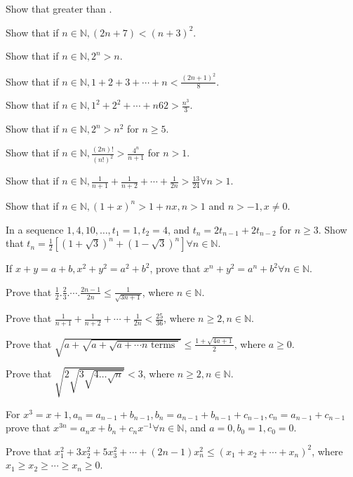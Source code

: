 \item Show that  greater
  than .
\item Show that if $n\in\mathbb{N}, (2n + 7) < (n + 3)^2$.
\item Show that if $n\in\mathbb{N}, 2^n > n$.
\item Show that if $n\in\mathbb{N}, 1 + 2 + 3 + \cdots + n < \frac{(2n + 1)^2}{8}$.
\item Show that if $n\in\mathbb{N}, 1^2 + 2^2 + \cdots + n62 > \frac{n^3}{3}$.
\item Show that if $n\in\mathbb{N}, 2^n > n^2$ for $n\geq 5$.
\item Show that if $n\in\mathbb{N}, \frac{(2n)!}{(n!)^2} > \frac{4^n}{n + 1}$ for $n > 1$.
\item Show that if $n\in\mathbb{N}, \frac{1}{n + 1} + \frac{1}{n + 2} + \cdots + \frac{1}{2n} >
  \frac{13}{24}\forall n > 1$.
\item Show that if $n\in\mathbb{N}, (1 + x)^n > 1 + nx, n > 1$ and $n > -1, x\neq 0$.
\item In a sequence $1, 4, 10, \ldots, t_1 = 1, t_2 = 4$, and $t_n = 2t_{n - 1 } + 2t_{n - 2}$ for $n\geq
  3$. Show that $t_n = \frac{1}{2}\left[(1 + \sqrt{3})^n + (1 - \sqrt{3})^n\right]\forall n\in\mathbb{N}$.
\item If $x + y = a + b, x^2 + y^2 = a^2 + b^2$, prove that $x^n + y^2 = a^n + b^2\forall n\in\mathbb{N}$.
\item Prove that $\frac{1}{2}.\frac{2}{3}.\cdots.\frac{2n - 1}{2n}\leq \frac{1}{\sqrt{3n + 1}}$, where $n\in\mathbb{N}$.
\item Prove that $\frac{1}{n + 1} + \frac{1}{n + 2} + \cdots + \frac{1}{2n} < \frac{25}{36}$, where $n\geq 2, n\in\mathbb{N}$.
\item Prove that $\sqrt{a + \sqrt{a + \sqrt{a + \cdots n\text{~terms~}}}}\leq \frac{1 + \sqrt{4a + 1}}{2}$, where $a\geq 0$.
\item Prove that $\sqrt{2\sqrt{3\sqrt{4\ldots\sqrt{n}}}} < 3$, where $n\geq 2, n\in\mathbb{N}$.
\item For $x^3 = x + 1, a_n = a_{n - 1} + b_{n - 1}, b_n = a_{n - 1} + b_{n - 1} + c_{n - 1}, c_n = a_{n -
    1} + c_{n - 1}$ prove that $x^{3n} = a_nx + b_n + c_nx^{-1}\forall n\in\mathbb{N}$, and $a=0, b_0 = 1,
  c_0 = 0$.
\item Prove that $x_1^2 + 3x_2^2 + 5x_3^2 + \cdots + (2n - 1)x_n^2\leq(x_1 + x_2 + \cdots + x_n)^2$, where $x_1\geq x_2\geq \cdots
  \geq x_n\geq 0$.
